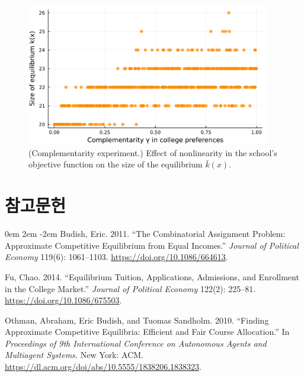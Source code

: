 \documentclass[12pt]{article} %
\newif\ifEN
\theoremstyle{definition}
\theoremstyle{definition}
\begin{document}
\begin{figure}[h!]
  \begin{center}\includegraphics[width=0.95\textwidth]{./TwoSchoolModels/CombiPref-complementarity/complementarity-k.pdf}\end{center}
  \caption{(Complementarity experiment.) Effect of nonlinearity in the school's objective function on the size of the equilibrium $\bar k(x)$.}
\end{figure}



\pagebreak
\ifEN \section{References} \else \section{참고문헌} \fi
\noindent

\parskip 0em
\leftskip 2em
\parindent -2em
Budish, Eric. 2011. ``The Combinatorial Assignment Problem: Approximate Competitive Equilibrium from Equal Incomes.'' \emph{Journal of Political Economy} 119(6): 1061--1103. \url{https://doi.org/10.1086/664613}. 

Fu, Chao. 2014. ``Equilibrium Tuition, Applications, Admissions, and Enrollment in the College Market.'' \emph{Journal of Political Economy} 122(2): 225--81. \url{https://doi.org/10.1086/675503}. 

Othman, Abraham, Eric Budish, and Tuomas Sandholm. 2010. ``Finding Approximate Competitive Equilibria: Efficient and Fair
Course Allocation.'' In \emph{Proceedings of 9th International Conference on Autonomous Agents and Multiagent Systems.} New York: ACM. \url{https://dl.acm.org/doi/abs/10.5555/1838206.1838323}.
\end{document}
